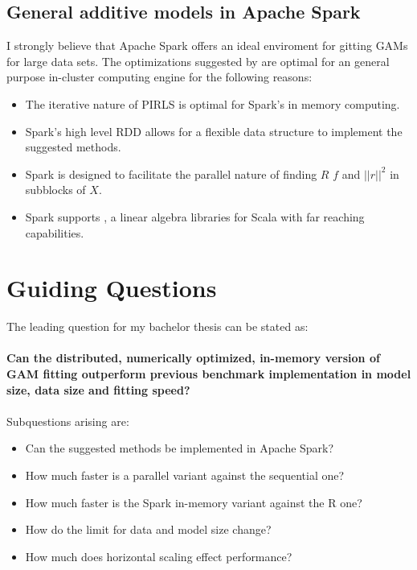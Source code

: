 \documentclass{article}
\begin{document}
    \subsection{General additive models in Apache Spark}
    I strongly believe that Apache Spark offers an ideal enviroment for gitting GAMs for large data sets. The optimizations suggested by \cite{bigdataGAM} are optimal for an general purpose in-cluster computing engine for the following reasons:
    \begin{itemize}
        \item The iterative nature of PIRLS is optimal for Spark's in memory computing.
        \item Spark's high level RDD allows for a flexible data structure to implement the suggested methods.
        \item Spark is designed to facilitate the parallel nature of finding $R$ $f$ and $||r||^2$ in subblocks of $X$.
        \item Spark supports \cite{Breeze}, a linear algebra libraries for Scala with far reaching capabilities.
    \end{itemize}

    \section{Guiding Questions}

    The leading question for my bachelor thesis can be stated as:
    \paragraph{Can the distributed, numerically optimized, in-memory version of GAM fitting outperform previous benchmark implementation in model size, data size and fitting speed?}

    \paragraph{}
    Subquestions arising are:
        \begin{itemize}
        \item Can the suggested methods be implemented in Apache Spark?
        \item How much faster is a parallel variant against the sequential one?
        \item How much faster is the Spark in-memory variant against the R one?
        \item How do the limit for data and model size change?
        \item How much does horizontal scaling effect performance?
        \end{itemize}
\end{document}
